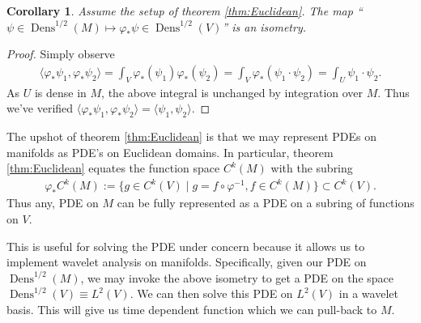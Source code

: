 \documentclass[letterpaper, 12 pt]{amsart}
\newcommand{\ram}[1]{\todo[inline,color=red!20]{#1}}
\newcommand{\R}{\mathbb{R}}
\newtheorem{thm}{Theorem}[section]
\newtheorem{cor}[thm]{Corollary}
\DeclareMathOperator{\Dens}{Dens}
\begin{document}
  \begin{cor}
    Assume the setup of theorem \ref{thm:Euclidean}.
    The map 
    ``$\psi \in \Dens^{1/2}(M) \mapsto \varphi_* \psi \in \Dens^{1/2}(V)$''
    is an isometry.
  \end{cor}
  \begin{proof}
    Simply observe
    \begin{align*}
      \langle \varphi_*\psi_1 , \varphi_*\psi_2 \rangle
      = \int_V \varphi_*(\psi_1) \varphi_*(\psi_2) 
      = \int_V \varphi_*( \psi_1 \cdot \psi_2) 
      = \int_U \psi_1 \cdot \psi_2.
    \end{align*}
    As $U$ is dense in $M$, the above integral is unchanged by integration
    over $M$.   Thus we've verified $\langle \varphi_* \psi_1,\varphi_*\psi_2 \rangle = \langle \psi_1,\psi_2 \rangle$.
  \end{proof}

  The upshot of theorem \ref{thm:Euclidean} is that we may represent PDEs on manifolds
  as PDE's on Euclidean domains.
  In particular, theorem \ref{thm:Euclidean} equates the function
  space $C^k(M)$ with the subring
  \begin{align*}
    \varphi_*C^k(M) := \{ g \in C^k(V) \mid g = f \circ \varphi^{-1} , f \in C^k(M) \} \subset C^k(V).
  \end{align*}
  Thus any, PDE on $M$ can be fully represented as a PDE on a 
  subring of functions on $V$. 
  
  This is useful for solving the PDE under concern because it allows
  us to implement wavelet analysis on manifolds.
  Specifically, given our PDE on $\Dens^{1/2}(M)$,
  we may invoke the above isometry to get a PDE
  on the space $\Dens^{1/2}(V) \equiv L^2(V)$.
  We can then solve this PDE on $L^2(V)$ in a wavelet
  basis.  This will give us time dependent 
  function which we can pull-back to $M$.

\end{document}
